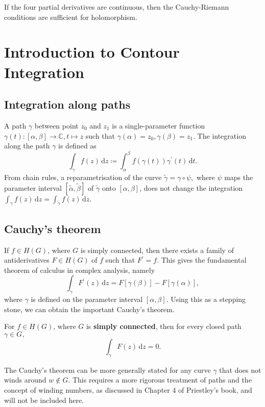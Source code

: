 \documentclass{article}
\begin{document}
If the four partial derivatives are continuous, then the Cauchy-Riemann conditions are sufficient for holomorphism. 

\section{Introduction to Contour Integration}
\subsection{Integration along paths}
A path $\gamma$ between point $z_0$ and $z_1$ is a single-parameter function $
    \gamma (t) \colon [\alpha ,\beta ] \to \mathbb{C}, t \mapsto z
$ such that $\gamma (\alpha )=z_0, \gamma (\beta ) = z_1.$ 
The integration along the path $\gamma $ is defined as 
\[
    \int_\gamma  f(z) \,\mathrm{d}z \coloneqq 
    \int_{\alpha }^{\beta } f(\gamma (t))\gamma^\prime (t) \,\mathrm{d}t.
\]
From chain rules, a reparametrisation of the curve $\widetilde{\gamma} = \gamma \circ \psi,$ where $\psi$ maps the parameter interval $[\widetilde{\alpha}, \widetilde{\beta}]$ of $\widetilde{\gamma}$ onto $[\alpha ,\beta]$, does not change the integration 
$\int_\gamma  f(z) \,\mathrm{d}z = \int_{\widetilde{\gamma}}   f(z) \,\mathrm{d}z. $ 

\subsection{Cauchy's theorem} \label{sec:Cauchy's theorem}
If $f\in H(G)$, where $G$ is simply connected, then there exists a family of antiderivatives $F \in H(G)$ of $f$ such that $F^\prime =f$. This gives the fundamental theorem of calculus in complex analysis, namely
\[
    \int_{\gamma }  F^\prime (z) \,\mathrm{d}z = F[\gamma (\beta )] - F[\gamma (\alpha )], 
\]
where $\gamma$ is defined on the parameter interval $[\alpha ,\beta ]$. Using this as a stepping stone, we can obtain the important Cauchy's theorem. 
\begin{frm-thm}
    For $f \in H(G)$, where $G$ is \textbf{simply connected}, then for every closed path $\gamma \in G,$
    \[
        \int_{\gamma }  F(z) \,\mathrm{d}z =0.
    \]
\end{frm-thm}
The Cauchy's theorem can be more generally stated for any curve $\gamma$ that does not winds around $w \notin G$. This requires a more rigorous treatment of paths and the concept of winding numbers, as discussed in Chapter 4 of Priestley's book, and will not be included here. 
\end{document}
